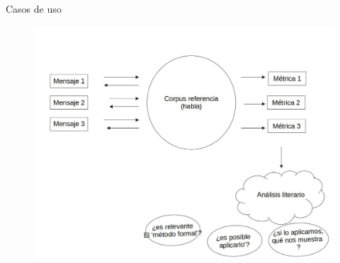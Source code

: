 \documentclass[presentation]{beamer}
\begin{document}
\begin{frame}[label={sec:org7f5ae6c}]{Casos de uso}
  \begin{figure}
   \includegraphics[width=\textwidth]{./assets/posibles_usos.jpg}

\end{figure}
\end{frame}
\end{document}

